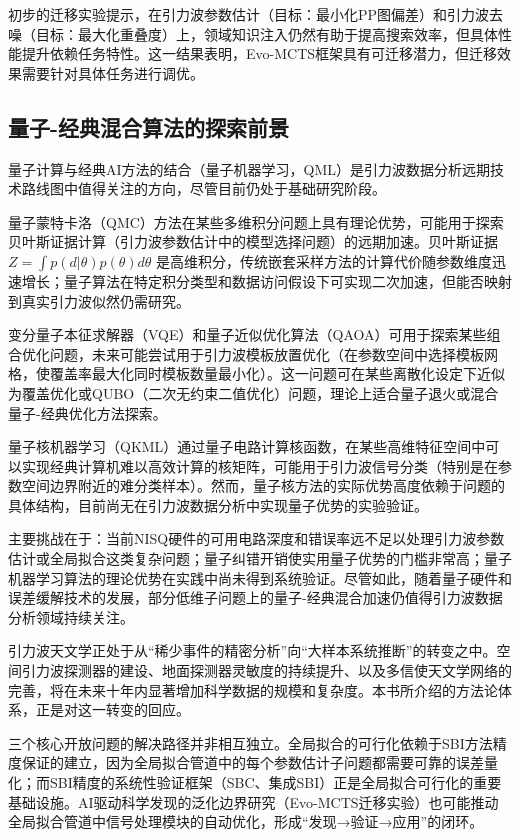 初步的迁移实验提示，在引力波参数估计（目标：最小化PP图偏差）和引力波去噪（目标：最大化重叠度）上，领域知识注入仍然有助于提高搜索效率，但具体性能提升依赖任务特性。这一结果表明，Evo-MCTS框架具有可迁移潜力，但迁移效果需要针对具体任务进行调优。

\subsection{量子-经典混合算法的探索前景}

量子计算与经典AI方法的结合（量子机器学习，QML）是引力波数据分析远期技术路线图中值得关注的方向，尽管目前仍处于基础研究阶段。

量子蒙特卡洛（QMC）方法在某些多维积分问题上具有理论优势，可能用于探索贝叶斯证据计算（引力波参数估计中的模型选择问题）的远期加速。贝叶斯证据 $Z = \int p(d|\theta)p(\theta)d\theta$ 是高维积分，传统嵌套采样方法的计算代价随参数维度迅速增长；量子算法在特定积分类型和数据访问假设下可实现二次加速，但能否映射到真实引力波似然仍需研究。

变分量子本征求解器（VQE）和量子近似优化算法（QAOA）可用于探索某些组合优化问题，未来可能尝试用于引力波模板放置优化（在参数空间中选择模板网格，使覆盖率最大化同时模板数量最小化）。这一问题可在某些离散化设定下近似为覆盖优化或QUBO（二次无约束二值优化）问题，理论上适合量子退火或混合量子-经典优化方法探索。

量子核机器学习（QKML）通过量子电路计算核函数，在某些高维特征空间中可以实现经典计算机难以高效计算的核矩阵，可能用于引力波信号分类（特别是在参数空间边界附近的难分类样本）。然而，量子核方法的实际优势高度依赖于问题的具体结构，目前尚无在引力波数据分析中实现量子优势的实验验证。

主要挑战在于：当前NISQ硬件的可用电路深度和错误率远不足以处理引力波参数估计或全局拟合这类复杂问题；量子纠错开销使实用量子优势的门槛非常高；量子机器学习算法的理论优势在实践中尚未得到系统验证。尽管如此，随着量子硬件和误差缓解技术的发展，部分低维子问题上的量子-经典混合加速仍值得引力波数据分析领域持续关注。

引力波天文学正处于从“稀少事件的精密分析”向“大样本系统推断”的转变之中。空间引力波探测器的建设、地面探测器灵敏度的持续提升、以及多信使天文学网络的完善，将在未来十年内显著增加科学数据的规模和复杂度。本书所介绍的方法论体系，正是对这一转变的回应。

三个核心开放问题的解决路径并非相互独立。全局拟合的可行化依赖于SBI方法精度保证的建立，因为全局拟合管道中的每个参数估计子问题都需要可靠的误差量化；而SBI精度的系统性验证框架（SBC、集成SBI）正是全局拟合可行化的重要基础设施。AI驱动科学发现的泛化边界研究（Evo-MCTS迁移实验）也可能推动全局拟合管道中信号处理模块的自动优化，形成“发现→验证→应用”的闭环。

